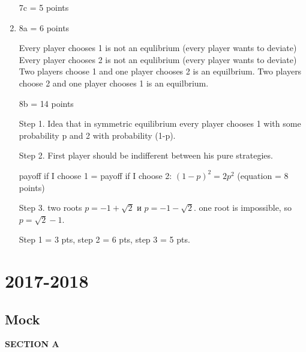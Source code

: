 \documentclass[12pt]{article} %
\theoremstyle{definition} %
\begin{document}
\begin{enumerate}
7c = 5 points

\item

8a = 6 points


Every player chooses 1 is not an equlibrium (every player wants to deviate)
Every player chooses 2 is not an equlibrium (every player wants to deviate)
Two players choose 1 and one player chooses 2 is an equilbrium.
Two players choose 2 and one player chooses 1 is an equilbrium.

8b = 14 points

Step 1. Idea that in symmetric equilibrium every player chooses 1 with some probability p and 2 with probability (1-p).

Step 2. First player should be indifferent between his pure strategies.

payoff if I choose 1 = payoff if I choose 2:
$(1-p)^2 = 2 p^2$ (equation = 8 points)

Step 3.  two roots $p = -1 + \sqrt{2}$ и $p= - 1 - \sqrt{2}$.
one root is impossible, so $p = \sqrt{2} - 1$.

Step 1 = 3 pts, step 2 = 6 pts, step 3 = 5 pts.
\end{enumerate}


\section{2017-2018}

\subsection{Mock}

\textbf{SECTION A}
\end{document}

